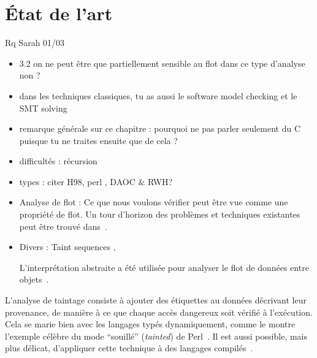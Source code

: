 \section{État de l'art}%

Rq Sarah 01/03

\begin{itemize}
\item
  3.2 on ne peut être que partiellement sensible au flot dans ce type
  d'analyse non ?
\item
  dans les techniques classiques, tu as aussi le software model checking
  et le SMT solving
\item
  remarque générale sur ce chapitre : pourquoi ne pas parler seulement
  du C puisque tu ne traites ensuite que de cela ?
\end{itemize}


\begin{itemize}
\item difficultés : récursion

\item
  types : citer H98\cite{haskell98}, perl \cite{perlCamelBook}, DAOC\cite{DAOC}
  \& RWH\cite{rwh}?
\item
  Analyse de flot :
Ce que nous voulons vérifier peut être vue comme une propriété de flot. Un tour
d'horizon des problèmes et techniques existantes peut être trouvé
dans~\cite{sm-jsac03}.

\item Divers : Taint sequences \cite{mdv10}, %

L'interprétation abstraite a été utilisée pour analyser le flot de données entre
objets~\cite{liang2012taint}.

\end{itemize}


L'analyse de taintage consiste à ajouter des étiquettes au données décrivant
leur provenance, de manière à ce que chaque accès dangereux soit vérifié à
l'exécution. Cela se marie bien avec les langages typés dynamiquement, comme le
montre l'exemple célèbre du mode ``souillé'' (\emph{tainted}) de
Perl~\cite{perlCamelBook}. Il est aussi possible, mais plus délicat, d'appliquer
cette technique à des langages compilés~\cite{clause-etal-issta07,oakland10}.


